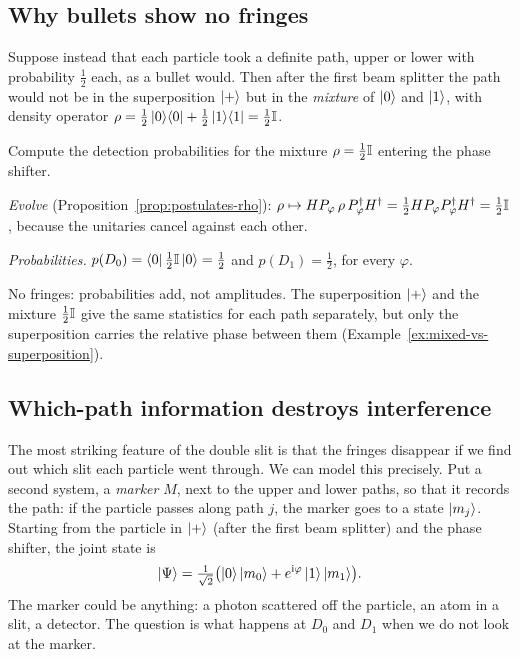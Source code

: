 \subsection{Why bullets show no fringes}

Suppose instead that each particle took a definite path, upper or lower with probability $\tfrac12$ each, as a bullet would. Then after the first beam splitter the path would not be in the superposition $\left|+\right\rangle$ but in the \emph{mixture} of $\left|0\right\rangle$ and $\left|1\right\rangle$, with density operator $\rho=\tfrac12\left|0\right\rangle\!\left\langle0\right|+\tfrac12\left|1\right\rangle\!\left\langle1\right|=\tfrac12\mathbb{I}$.

\begin{example}\label{ex:mz-mixture}
  Compute the detection probabilities for the mixture $\rho=\tfrac12\mathbb{I}$ entering the phase shifter.
\end{example}
\begin{solution}
  \begin{steps}
    \item \emph{Evolve} (Proposition~\ref{prop:postulates-rho}): $\rho\mapsto HP_\varphi\,\rho\,P_\varphi^\dagger H^\dagger=\tfrac12HP_\varphi P_\varphi^\dagger H^\dagger=\tfrac12\mathbb{I}$, because the unitaries cancel against each other.
    \item \emph{Probabilities.} $p(D_0)=\left\langle0\right|\tfrac12\mathbb{I}\left|0\right\rangle=\tfrac12$ and $p(D_1)=\tfrac12$, for every $\varphi$.
  \end{steps}
  No fringes: probabilities add, not amplitudes. The superposition $\left|+\right\rangle$ and the mixture $\tfrac12\mathbb{I}$ give the same statistics for each path separately, but only the superposition carries the relative phase between them (Example~\ref{ex:mixed-vs-superposition}).
\end{solution}

\subsection{Which-path information destroys interference}

The most striking feature of the double slit is that the fringes disappear if we find out which slit each particle went through. We can model this precisely. Put a second system, a \emph{marker} $M$, next to the upper and lower paths, so that it records the path: if the particle passes along path $j$, the marker goes to a state $\left|m_j\right\rangle$. Starting from the particle in $\left|+\right\rangle$ (after the first beam splitter) and the phase shifter, the joint state is
\[
  \left|\Psi\right\rangle=\tfrac1{\sqrt2}\bigl(\left|0\right\rangle\left|m_0\right\rangle+e^{\mathrm{i}\varphi}\left|1\right\rangle\left|m_1\right\rangle\bigr).
\]
The marker could be anything: a photon scattered off the particle, an atom in a slit, a detector. The question is what happens at $D_0$ and $D_1$ when we do not look at the marker.

